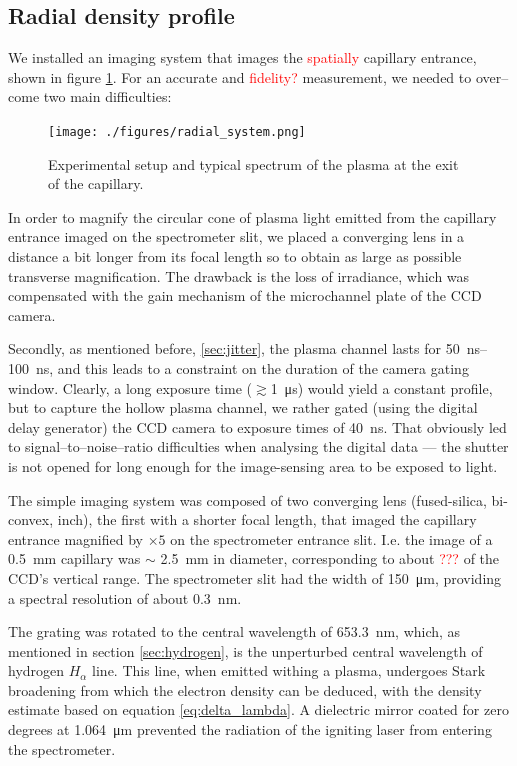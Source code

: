 \documentclass[justified,nofonts,nobib]{tufte-book}
\begin{document}
\subsection{Radial density profile}\label{ssec:radial}
We installed an imaging system that images the \textcolor{red}{spatially} capillary entrance, shown in figure \ref{fig:radial_system}. For an accurate and \textcolor{red}{fidelity?} measurement, we needed to over--come two main difficulties:

	\begin{figure}
	    \texttt{[image: ./figures/radial\_system.png]}
	    \caption{Experimental setup and typical spectrum of the plasma at the exit of the capillary.}
	    \label{fig:radial_system}
	\end{figure}

In order to magnify the circular cone of plasma light emitted from the capillary entrance imaged on the spectrometer slit, we placed a converging lens in a distance a bit longer from its focal length so to obtain as large as possible transverse magnification. The drawback is the loss of irradiance, which was compensated with the gain mechanism of the microchannel plate of the CCD camera.

Secondly, as mentioned before, \ref{sec:jitter}, the plasma channel lasts for \SIrange{50}{100}{\ns}, and this leads to a constraint on the duration of the camera gating window. Clearly, a long exposure time ($\gtrsim$\SI{1}{\us}) would yield a constant profile, but to capture the hollow plasma channel, we rather gated (using the digital delay generator) the CCD camera to exposure times of \SI{40}{\ns}. That obviously led to signal--to--noise--ratio difficulties when analysing the digital data --- the shutter is not opened for long enough for the image-sensing area to be exposed to light.

The simple imaging system was composed of two converging lens (fused-silica, bi-convex,  inch), the first with a shorter focal length, that imaged the capillary entrance magnified by $\times 5$ on the spectrometer entrance slit. I.e. the image of a \SI{0.5}{\mm} capillary was $\sim$ \SI{2.5}{\mm} in diameter, corresponding to about \textcolor{red}{???} of the CCD's vertical range. The spectrometer slit had the width of \SI{150}{\micro\metre}, providing a spectral resolution of about \SI{0.3}{\nm}.

The grating was rotated to the central wavelength of \SI{653.3}{\nm}, which, as mentioned in section \ref{sec:hydrogen}, is the unperturbed central wavelength of hydrogen $H_\alpha$ line. This line, when emitted withing a plasma, undergoes Stark broadening from which the electron density can be deduced, with the density estimate based on equation \ref{eq:delta_lambda}. A dielectric mirror coated for zero degrees at \SI{1.064}{\um} prevented the radiation of the igniting laser from entering the spectrometer.
\end{document}
